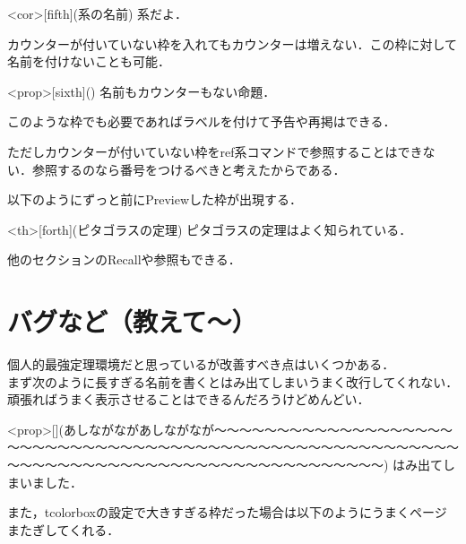\documentclass[11pt, a4paper]{ltjsarticle}
\begin{document}
\begin{statementsp*}<cor>[fifth](系の名前)
    系だよ．    
\end{statementsp*}

カウンターが付いていない枠を入れてもカウンターは増えない．この枠に対して名前を付けないことも可能．

\begin{statementsp*}<prop>[sixth]()
    名前もカウンターもない命題．    
\end{statementsp*}

このような枠でも必要であればラベルを付けて予告や再掲はできる．


ただしカウンターが付いていない枠をref系コマンドで参照することはできない．参照するのなら番号をつけるべきと考えたからである．

以下のようにずっと前にPreviewした枠が出現する．

\begin{statementsp}<th>[forth](ピタゴラスの定理)
    ピタゴラスの定理はよく知られている．    
\end{statementsp}

他のセクションのRecallや参照もできる．



\section{バグなど（教えて～）}
個人的最強定理環境だと思っているが改善すべき点はいくつかある．\\ 
まず次のように長すぎる名前を書くとはみ出てしまいうまく改行してくれない．頑張ればうまく表示させることはできるんだろうけどめんどい．

\begin{statementsp}<prop>[](あしながながあしながなが～～～～～～～～～～～～～～～～～～～～～～～～～～～～～～～～～～～～～～～～～～～～～～～～～～～～～～～～～～～～～～～～～～～～～～～～～～～～～～～～～～～～～)
    はみ出てしまいました．
\end{statementsp}

また，tcolorboxの設定で大きすぎる枠だった場合は以下のようにうまくページまたぎしてくれる．
\end{document}
